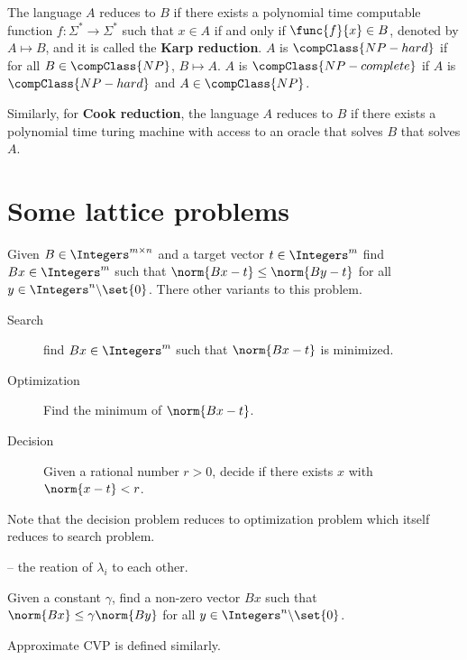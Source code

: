 The language \(A\) reduces to \(B\) if there exists a polynomial time computable function \(f:\Sigma^{\ast} \to \Sigma^{\ast}\) such that \(x \in A\) if and only if \(\func{f}{x} \in B\), denoted by \(A \mapsto B\), and it is called the \textbf{Karp reduction}. \(A\) is \(\compClass{NP-hard}\) if for all \(B \in \compClass{NP}\), \(B \mapsto A\). \(A\) is \(\compClass{NP-complete}\) if \(A\) is \(\compClass{NP-hard}\) and \(A \in \compClass{NP}\). 

Similarly, for \textbf{Cook reduction}, the language \(A\) reduces to \(B\) if there exists a polynomial time turing machine with access to an oracle that solves \(B\) that solves \(A\).

\section{Some lattice problems}
\begin{definition}
    Given \(B \in \Integers^{m \times n}\) and a target vector \(t \in \Integers^{m}\) find \(Bx \in \Integers^m\) such that \(\norm{Bx - t} \leq \norm{By - t}\) for all \(y \in \Integers^n \backslash \set{0}\). There other variants to this problem.
    \begin{description}
        \item[Search] find \(Bx \in \Integers^m\) such that \(\norm{Bx - t}\) is minimized.
        \item[Optimization] Find the minimum of \(\norm{Bx -t}\).
        \item[Decision] Given a rational number \(r > 0\), decide if there exists \(x\) with \(\norm{x - t} < r\). 
    \end{description}
    Note that the decision problem reduces to optimization problem which itself reduces to search problem.
\end{definition}
-- the reation of \(\lambda_i\) to each other.
\begin{definition}
    Given a constant \(\gamma\), find a non-zero vector \(Bx\) such that \(\norm{Bx} \leq \gamma\norm{By}\) for all \(y \in \Integers^{n} \backslash \set{0}\).
\end{definition}
Approximate CVP is defined similarly.

